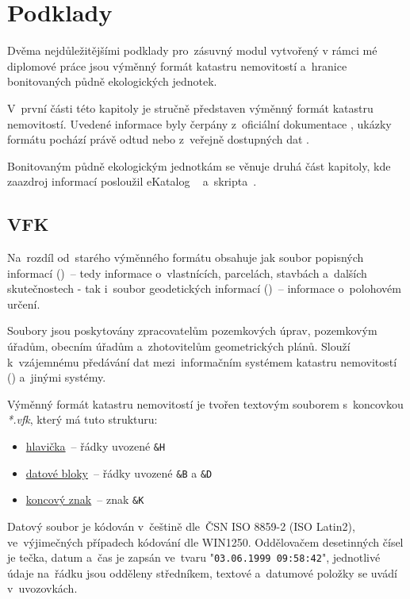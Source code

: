 \chapter{Podklady}
\label{podklady}

Dvěma nejdůležitějšími podklady pro~zásuvný modul vytvořený v rámci mé diplomové práce jsou výměnný formát katastru nemovitostí a~hranice bonitovaných půdně ekologických jednotek.

V~první části této kapitoly je stručně představen výměnný formát katastru nemovitostí. Uvedené informace byly čerpány z~oficiální dokumentace \citep{struktura_vfk}, ukázky formátu pochází právě odtud nebo z~veřejně dostupných dat \citep{zdroj_vfk}.

Bonitovaným půdně ekologickým jednotkám se věnuje druhá část kapitoly, kde zaazdroj informací posloužil eKatalog ~\citep{vumop_bpej} a~skripta~\citep{pu_skripta}.

\section{VFK}
\label{vfk}

Na~rozdíl od~starého výměnného formátu obsahuje  jak soubor popisných informací ()~– tedy informace o~vlastnících, parcelách, stavbách a~dalších skutečnostech - tak i~soubor geodetických informací ()~– informace o~polohovém určení.

Soubory  jsou poskytovány zpracovatelům pozemkových úprav, pozemkovým úřadům, obecním úřadům a~zhotovitelům geometrických plánů. Slouží k~vzájemnému předávání dat mezi~informačním systémem katastru nemovitostí () a~jinými systémy.

Výměnný formát katastru nemovitostí je tvořen textovým souborem s~koncovkou \textit{*.vfk}, který má tuto strukturu:
	\begin{itemize}[leftmargin=1.5cm, noitemsep]
		\item \underline{hlavička}~– řádky uvozené \texttt{\&H}
		\item \underline{datové bloky}~– řádky uvozené \texttt{\&B} a \texttt{\&D}
		\item \underline{koncový znak}~– znak \texttt{\&K}
	\end{itemize}

Datový soubor je kódován v~češtině dle~ČSN ISO 8859-2 (ISO Latin2), ve~výjimečných případech kódování dle
WIN1250. Oddělovačem desetinných čísel je tečka, datum a~čas je zapsán ve~tvaru "\texttt{03.06.1999 09:58:42}", jednotlivé údaje na~řádku jsou odděleny středníkem, textové a~datumové položky se uvádí v~uvozovkách.

